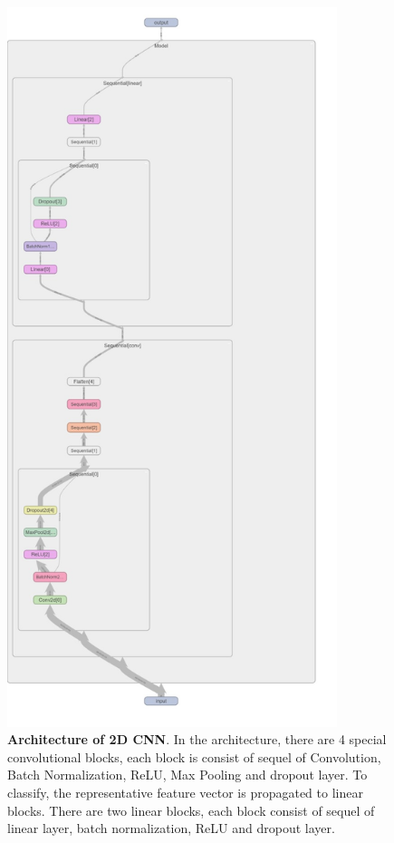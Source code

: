 \documentclass[10pt, twocolumn, letterpaper]{article}
\begin{document}
\begin{figure}
\centering
 \includegraphics[width=0.8\linewidth, height = 21cm]{images/2dcnn.jpeg}
   \caption{\textbf{Architecture of 2D CNN}. In the architecture, there are 4 special convolutional blocks, each block is consist of sequel of Convolution, Batch Normalization, ReLU, Max Pooling and dropout layer. To classify, the representative feature vector is propagated to linear blocks. There are two linear blocks, each block consist of sequel of linear layer, batch normalization, ReLU and dropout layer.}
\label{fig:2dcnn}
\end{figure}
\end{document}
